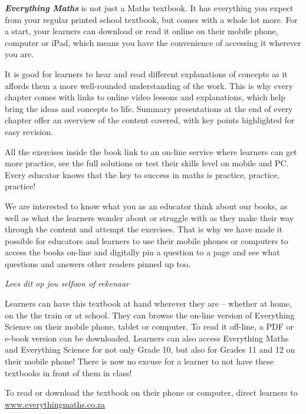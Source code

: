 \par
{\Large
\textbf{\textit{Everything Maths}} is not just a Maths textbook. It has everything you expect from
your regular printed school textbook, but comes with a whole lot more. For a start, your learners can download or read it
online on their mobile phone, computer or iPad, which means you have the convenience of accessing
it wherever you are.\par


It is good for learners to hear and read different explanations of concepts as it affords them a more well-rounded understanding of the work. This is why every chapter comes with links to online video
lessons and explanations, which help bring the ideas and concepts to life. Summary presentations at
the end of every chapter offer an overview of the content covered, with key points highlighted for easy
revision.\par

All the exercises inside the book link to an on-line service where
learners can get more practice, see the full
solutions or test their skills level on mobile and PC. Every educator knows that the key to success in maths is practice, practice, practice!
\par


We are interested to know what you as an educator think about our books, as well as what the learners
wonder about or struggle with as they make their way through the content and attempt the exercises. That is
why we have made it possible for educators and learners to use their mobile phones or computers to access
the books on-line and digitally pin a question to a page and see what questions and answers other readers
pinned up too.
\par


}




\newpage
\thispagestyle{empty}

{\normalfont\sffamily\fontsize{22}\normalfont\itshape Lees dit op jou selfoon of rekenaar} \par

{\Large
Learners can have this textbook at hand wherever they are – whether at home, on the the train or at school.
They can browse the on-line version of Everything Science on their mobile phone, tablet or computer. To
read it off-line, a PDF or e-book version can be downloaded. Learners can also access Everything Maths
and Everything Science for not only Grade 10, but also for Grades 11 and 12 on their mobile phone! There is
now no excuse for a learner to not have these textbooks in front of them in class!
\par


To read or download the textbook on their phone or computer, direct learners to \\ \underline{www.everythingmaths.co.za}} \vspace*{2cm}


